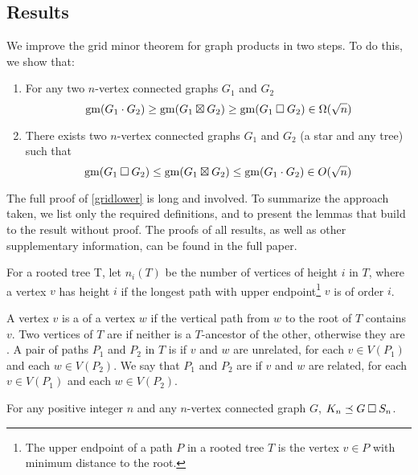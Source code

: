 \documentclass[../main.tex]{subfiles}
\begin{document}
	\subsection{Results}
	We improve the grid minor theorem for graph products in two steps. To do this, we show that:
	\begin{enumerate}
		\item  For any two $n$-vertex connected graphs $G_1$ and $G_2$
		\begin{equation} \label{gridlower}
			\operatorname{gm}(G_1\cdot G_2) \geq \operatorname{gm}(G_1\boxtimes G_2) \geq \operatorname{gm}(G_1\mathbin{\Box} G_2) \in \Omega(\sqrt{n})
		\end{equation} 
		
		\item There exists two $n$-vertex connected graphs $G_1$ and $G_2$ (a star and any tree) such that   
		\begin{equation} \label{gridupper}
			\operatorname{gm}(G_1\mathbin{\Box} G_2) \leq \operatorname{gm}(G_1\boxtimes G_2) \leq \operatorname{gm}(G_1\cdot G_2) \in O(\sqrt{n}) 
		\end{equation} 
	\end{enumerate}
	
		The full proof of \cref{gridlower} is long and involved. To summarize the approach taken, we list only the required definitions, and to present the lemmas that build to the result without proof. The proofs of all results, as well as other supplementary information, can be found in the full paper. \cite{DMWW24}
	
	For a rooted tree T, let $n_i(T)$ be the number of vertices of height $i$ in $T$, where a vertex $v$ has height $i$ if the longest path with upper endpoint\footnote{The upper endpoint of a path $P$ in a rooted tree $T$ is the vertex $v\in P$ with minimum distance to the root.} $v$ is of order $i$.
	
	A vertex $v$ is a  of a vertex $w$ if the vertical path from $w$ to the root of $T$ contains $v$.  Two vertices of $T$ are  if neither is a $T$-ancestor of the other, otherwise they are .  A pair of paths $P_1$ and $P_2$ in $T$ is  if $v$ and $w$ are unrelated, for each $v\in V(P_1)$ and each $w\in V(P_2)$.  We say that $P_1$ and $P_2$ are  if $v$ and $w$ are related, for each $v\in V(P_1)$ and each $w\in V(P_2)$.
	
	\begin{lem}\label{anything_times_star}
		For any positive integer $n$ and any $n$-vertex connected graph $G$, $K_{n} \preceq G\mathbin{\Box} S_n$.
	\end{lem}
	
\end{document}
